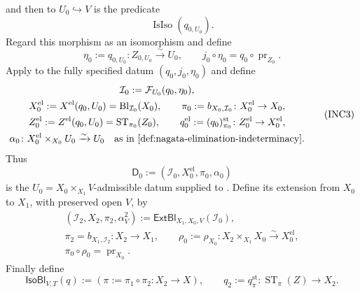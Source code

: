 \begin{definition}
  and then to $U_0\hookrightarrow V$ is the predicate
  \[
    \operatorname{IsIso}(q_{0,U_0}).                              \tag{INC1}
  \]
  Regard this morphism as an isomorphism and define
  \[
    \eta_0:=q_{0,U_0}\colon Z_{0,U_0}\xrightarrow{\sim}U_0,
    \qquad
    j_0\circ\eta_0=q_0\circ\operatorname{pr}_{Z_0}.              \tag{INC2}
  \]
  Apply  to the fully specified
  datum $(q_0,j_0,\eta_0)$ and define
  \[
  \begin{gathered}
    \mathcal I_0:=\mathcal F_{U_0}(q_0,\eta_0),\\
    X_0^{\mathrm{el}}:=X^{\mathrm{el}}(q_0,U_0)
      =\operatorname{Bl}_{\mathcal I_0}(X_0),\qquad
    \pi_0:=b_{X_0,\mathcal I_0}\colon X_0^{\mathrm{el}}\to X_0,\\
    Z_0^{\mathrm{el}}:=Z^{\mathrm{el}}(q_0,U_0)
      =\operatorname{ST}_{\pi_0}(Z_0),\qquad
    q_0^{\mathrm{el}}:=(q_0)^{\mathrm{st}}_{\pi_0}
      \colon Z_0^{\mathrm{el}}\to X_0^{\mathrm{el}},\\
    \alpha_0\colon X_0^{\mathrm{el}}\times_{X_0}U_0
      \xrightarrow{\sim}U_0
      \quad\text{as in \Cref{def:nagata-elimination-indeterminacy}}.
  \end{gathered}                                                    \tag{INC3}
  \]
  Thus
  \[
    \mathsf D_0:=(\mathcal I_0,X_0^{\mathrm{el}},\pi_0,\alpha_0)
  \]
  is the $U_0=X_0\times_{X_1}V$-admissible datum supplied to
  .  Define its extension from
  $X_0$ to $X_1$, with preserved open $V$, by
  \[
  \begin{gathered}
    (\mathcal I_2,X_2,\pi_2,\alpha_V^2)
      :=\mathsf{ExtBl}_{X_1,X_0,V}(\mathcal I_0),\\
    \pi_2=b_{X_1,\mathcal I_2}\colon X_2\to X_1,\qquad
    \rho_0:=\rho_{X_0}\colon
      X_2\times_{X_1}X_0\xrightarrow{\sim}X_0^{\mathrm{el}},\\
    \pi_0\circ\rho_0=\operatorname{pr}_{X_0}.
  \end{gathered}                                                    \tag{INC4}
  \]
  Finally define
  \[
    \mathsf{IsoBl}_{V,T}(q)
      :=(\pi:=\pi_1\circ\pi_2\colon X_2\to X),
    \qquad
    q_2:=q^{\mathrm{st}}_\pi\colon
      \operatorname{ST}_\pi(Z)\to X_2.
  \]
\end{definition}

